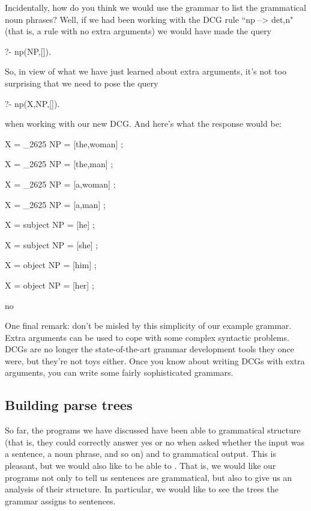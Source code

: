 Incidentally, how do you think we would use the grammar to list the
grammatical noun phrases?  Well, if we had been working with the DCG
rule ``np --> det,n" (that is, a rule with no extra arguments)
we would have made the query
\begin{LPNcodedisplay}
?- np(NP,[]).
\end{LPNcodedisplay}
So, in view of what we have just learned about extra arguments, it's
not too surprising that we need to pose the query
\begin{LPNcodedisplay}
?- np(X,NP,[]).
\end{LPNcodedisplay}
when working with our new DCG. And here's what the response would be:
\begin{LPNcodedisplay}
X = _2625
NP = [the,woman] ;

X = _2625
NP = [the,man] ;

X = _2625
NP = [a,woman] ;

X = _2625
NP = [a,man] ;

X = subject
NP = [he] ;

X = subject
NP = [she] ;

X = object
NP = [him] ;

X = object
NP = [her] ;

no
\end{LPNcodedisplay}




One final remark: don't be misled by this simplicity of our example
grammar.  Extra arguments can be used to cope with some complex
syntactic problems.  DCGs are no longer the state-of-the-art grammar
development tools they once were, but they're not toys either.  Once
you know about writing DCGs with extra arguments, you can write some
fairly sophisticated grammars.

\subsection*{Building parse trees}\label{SUBSEC.L8.PARSE.TREES}



So far, the programs we have discussed have been able to
grammatical structure (that is, they could correctly
answer yes  or  no when asked whether the input was a sentence,
a noun phrase, and so on) and to  grammatical
output.  This is pleasant, but we would also like to be able to
.  That is, we would like our programs not only
to tell us  sentences are grammatical, but also to give
us an analysis of their structure.  In particular, we would like to
see the trees the grammar assigns to sentences.

